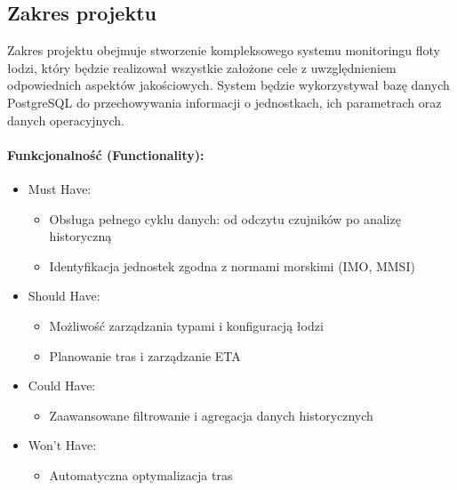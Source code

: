 \documentclass[12pt,a4paper,polish]{article}
\begin{document}
\subsection{Zakres projektu}

Zakres projektu obejmuje stworzenie kompleksowego systemu monitoringu floty łodzi, który będzie realizował wszystkie założone cele z uwzględnieniem odpowiednich aspektów jakościowych. System będzie wykorzystywał bazę danych PostgreSQL do przechowywania informacji o jednostkach, ich parametrach oraz danych operacyjnych.

\paragraph{Funkcjonalność (Functionality):}
\begin{itemize}
	\item Must Have:
	      \begin{itemize}
		      \item Obsługa pełnego cyklu danych: od odczytu czujników po analizę historyczną
		      \item Identyfikacja jednostek zgodna z normami morskimi (IMO, MMSI)
	      \end{itemize}
	\item Should Have:
	      \begin{itemize}
		      \item Możliwość zarządzania typami i konfiguracją łodzi
		      \item Planowanie tras i zarządzanie ETA
	      \end{itemize}
	\item Could Have:
	      \begin{itemize}
		      \item Zaawansowane filtrowanie i agregacja danych historycznych
	      \end{itemize}
	\item Won't Have:
	      \begin{itemize}
		      \item Automatyczna optymalizacja tras
	      \end{itemize}
\end{itemize}
\end{document}
